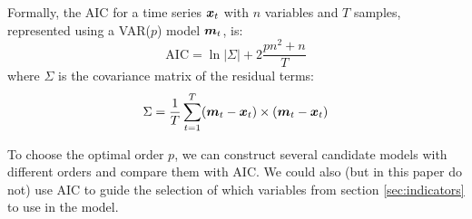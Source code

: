     Formally, the AIC for a time series $\boldsymbol{x}_t$ with $n$ 
    variables and $T$ samples, represented using a VAR($p$) model $\boldsymbol{m}_t$, is:
        \begin{equation} \mathrm{AIC} = \ln|\Sigma| + 2\frac{p n^2 + n}{T} \end{equation}
    where $\Sigma$ is the covariance matrix of the residual terms:
        \begin{equation} \Sigma = \frac{1}{T} \sum_{t=1}^T (\boldsymbol{m}_t - \boldsymbol{x}_t) \times (\boldsymbol{m}_t - \boldsymbol{x}_t) \end{equation}

    To choose the optimal order $p$, we can construct several candidate models
    with different orders and compare them with AIC.  We could also (but in this paper do
    not) use AIC to guide the selection of which variables from section \ref{sec:indicators}
    to use in the model.
